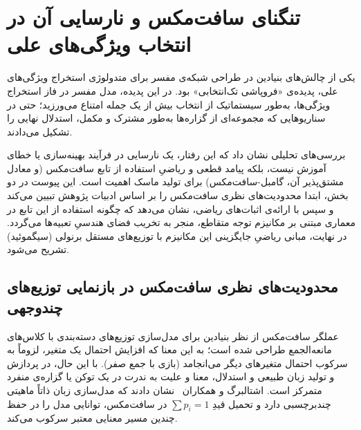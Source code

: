 
\section{تنگنای سافت‌مکس و نارسایی آن در انتخاب ویژگی‌های علی}\label{app:appendix_softmax_bottleneck}

یکی از چالش‌های بنیادین در طراحی شبکه‌ی مفسر برای متدولوژی استخراج ویژگی‌های علی، پدیده‌ی «فروپاشی تک‌انتخابی» بود. در این پدیده، مدل مفسر در فاز استخراج ویژگی‌ها، به‌طور سیستماتیک از انتخاب بیش از یک جمله امتناع می‌ورزید؛ حتی در سناریوهایی که مجموعه‌ای از گزاره‌ها به‌طور مشترک و مکمل، استدلال نهایی را تشکیل می‌دادند. 

بررسی‌های تحلیلی نشان داد که این رفتار، یک نارسایی در فرآیند بهینه‌سازی یا خطای آموزش نیست، بلکه پیامد قطعی و ریاضیِ استفاده از تابع سافت‌مکس (و معادل مشتق‌پذیر آن، گامبل-سافت‌مکس) برای تولید ماسک اهمیت است. این پیوست در دو بخش، ابتدا محدودیت‌های نظری سافت‌مکس را بر اساس ادبیات پژوهش تبیین می‌کند و سپس با ارائه‌ی اثبات‌های ریاضی، نشان می‌دهد که چگونه استفاده از این تابع در معماری مبتنی بر مکانیزم توجه متقاطع، منجر به تخریب فضای هندسیِ تعبیه‌ها می‌گردد. در نهایت، مبانی ریاضیِ جایگزینی این مکانیزم با توزیع‌های مستقل برنولی (سیگموئید) تشریح می‌شود.


\subsection{محدودیت‌های نظری سافت‌مکس در بازنمایی توزیع‌های چندوجهی}

عملگر سافت‌مکس از نظر بنیادین برای مدل‌سازی توزیع‌های دسته‌بندی با کلاس‌های مانعه‌الجمع طراحی شده است؛ به این معنا که افزایش احتمال یک متغیر، لزوماً به سرکوب احتمال متغیرهای دیگر می‌انجامد (بازی با جمع صفر). با این حال، در پردازش و تولید زبان طبیعی و استدلال، معنا و علیت به ندرت در یک توکن یا گزاره‌ی منفرد متمرکز است. اشتالبرگ و همکاران~\cite{stahlberg2022jam} نشان دادند که مدل‌سازی زبان ذاتاً ماهیتی چندبرچسبی دارد و تحمیل قیدِ $\sum p_i = 1$ در سافت‌مکس، توانایی مدل را در حفظ چندین مسیر معنایی معتبر سرکوب می‌کند. 


